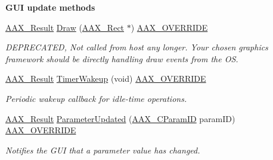 \begin{Indent}\textbf{ G\+UI update methods}\par
\begin{DoxyCompactItemize}
\item 
\mbox{\hyperlink{a00392_a4d8f69a697df7f70c3a8e9b8ee130d2f}{A\+A\+X\+\_\+\+Result}} \mbox{\hyperlink{a01477_a7a6e6ffea34c7c85f6e3d00bb6e564e0}{Draw}} (\mbox{\hyperlink{a01613}{A\+A\+X\+\_\+\+Rect}} $\ast$) \mbox{\hyperlink{a00392_ac2f24a5172689ae684344abdcce55463}{A\+A\+X\+\_\+\+O\+V\+E\+R\+R\+I\+DE}}
\begin{DoxyCompactList}\small\item\em D\+E\+P\+R\+E\+C\+A\+T\+ED, Not called from host any longer. Your chosen graphics framework should be directly handling draw events from the OS. \end{DoxyCompactList}\item 
\mbox{\hyperlink{a00392_a4d8f69a697df7f70c3a8e9b8ee130d2f}{A\+A\+X\+\_\+\+Result}} \mbox{\hyperlink{a01477_a0b7bada7e7d72da637bde2daa79f71ee}{Timer\+Wakeup}} (void) \mbox{\hyperlink{a00392_ac2f24a5172689ae684344abdcce55463}{A\+A\+X\+\_\+\+O\+V\+E\+R\+R\+I\+DE}}
\begin{DoxyCompactList}\small\item\em Periodic wakeup callback for idle-\/time operations. \end{DoxyCompactList}\item 
\mbox{\hyperlink{a00392_a4d8f69a697df7f70c3a8e9b8ee130d2f}{A\+A\+X\+\_\+\+Result}} \mbox{\hyperlink{a01477_aa86943fbaf8920b533ea31a7669fb009}{Parameter\+Updated}} (\mbox{\hyperlink{a00392_a1440c756fe5cb158b78193b2fc1780d1}{A\+A\+X\+\_\+\+C\+Param\+ID}} param\+ID) \mbox{\hyperlink{a00392_ac2f24a5172689ae684344abdcce55463}{A\+A\+X\+\_\+\+O\+V\+E\+R\+R\+I\+DE}}
\begin{DoxyCompactList}\small\item\em Notifies the G\+UI that a parameter value has changed. \end{DoxyCompactList}\end{DoxyCompactItemize}
\end{Indent}
